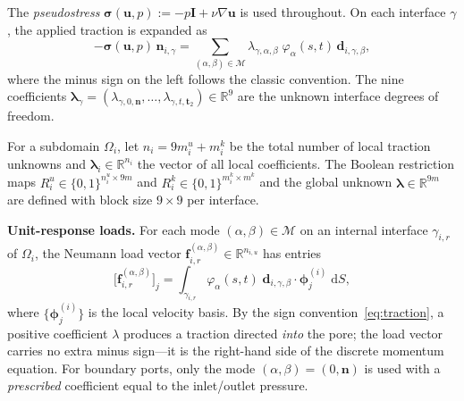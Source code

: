 \documentclass[11pt,a4paper]{article}
\newcommand{\R}{\mathbb{R}}
\newcommand{\pore}[1]{\Omega_{#1}}
\newcommand{\iface}{\gamma}
\newcommand{\vel}{\bm{u}}
\newcommand{\pres}{p}
\newcommand{\stress}{\bm{\sigma}}
\newcommand{\normal}{\bm{n}}
\newcommand{\trac}{\bm{\lambda}}
\newcommand{\modeset}{\mathcal{M}}
\newcommand{\loadvec}{\bm{f}}
\begin{document}
The \emph{pseudostress} $\stress(\vel,\pres) := -\pres\mathbf{I}
+ \nu\nabla\vel$ is used throughout.  On each interface $\iface$, the
applied traction is expanded as
\begin{equation}\label{eq:traction}
  -\stress(\vel,\pres)\,\normal_{i,\iface}
  = \sum_{(\alpha,\beta)\in\modeset}
    \lambda_{\iface,\alpha,\beta}\;
    \varphi_\alpha(s,t)\,\bm{d}_{i,\iface,\beta},
\end{equation}
where the minus sign on the left follows the classic convention.
The nine coefficients $\bm{\lambda}_\iface
= (\lambda_{\iface,0,\normal},\dots,\lambda_{\iface,t,\bm{t}_2})
\in \R^9$ are the unknown interface degrees of freedom.

For a subdomain $\pore{i}$, let $n_i = 9m_i^u + m_i^k$ be the total number of
local traction unknowns and $\trac_i \in \R^{n_i}$ the vector of all local
coefficients.  The Boolean restriction maps $R_i^u \in \{0,1\}^{n_i^u \times
9m}$ and $R_i^k \in \{0,1\}^{m_i^k \times m^k}$ and the global unknown
$\trac \in \R^{9m}$ are defined with block size $9\times9$ per interface.

\medskip\noindent
\textbf{Unit-response loads.}
For each mode $(\alpha,\beta) \in \modeset$ on an internal interface
$\iface_{i,r}$ of $\pore{i}$, the Neumann load vector
$\loadvec_{i,r}^{(\alpha,\beta)} \in \R^{n_{i,u}}$ has entries
\begin{equation}\label{eq:load}
  \bigl[\loadvec_{i,r}^{(\alpha,\beta)}\bigr]_j
  = \int_{\iface_{i,r}} \varphi_\alpha(s,t)\;
    \bm{d}_{i,\gamma,\beta} \cdot \bm{\phi}_j^{(i)} \;\mathrm{d}S,
\end{equation}
where $\{\bm{\phi}_j^{(i)}\}$ is the local velocity basis.
By the sign convention~\eqref{eq:traction}, a positive coefficient
$\lambda$ produces a traction directed \emph{into} the pore; the load
vector carries no extra minus sign---it is the right-hand side of the
discrete momentum equation.  For boundary ports, only the mode
$(\alpha,\beta) = (0,\normal)$ is used with a \emph{prescribed} coefficient
equal to the inlet/outlet pressure.
\end{document}
